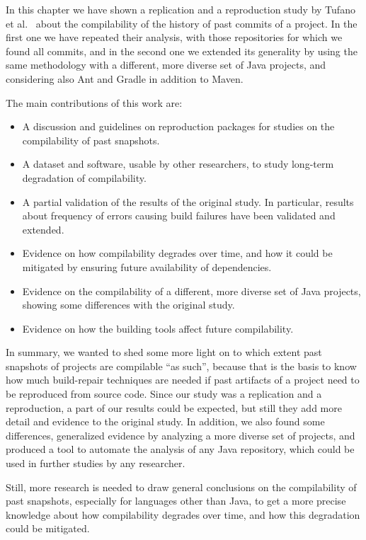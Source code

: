 In this chapter we have shown a replication and a reproduction study by Tufano et al.~\cite{tufano2017there} about the compilability of the history of past commits of a project. In the first one we have repeated their analysis, with those repositories for which we found all commits, and in the second one we extended its generality by using the same methodology with a different, more diverse set of Java projects, and considering also Ant and Gradle in addition to Maven.

The main contributions of this work are:

\begin{itemize}
\item A discussion and guidelines on reproduction packages for studies on the compilability of past snapshots. 
\item A dataset and software, usable by other researchers, to study long-term degradation of compilability.
\item A partial validation of the results of the original study. In particular, results about frequency of errors causing build failures have been validated and extended.
\item Evidence on how compilability degrades over time, and how it could be mitigated by ensuring future availability of dependencies.
\item Evidence on the compilability of a different, more diverse set of Java projects, showing some differences with the original study.
\item Evidence on how the building tools affect future compilability.
\end{itemize}

In summary, we wanted to shed some more light on to which extent past snapshots of projects are compilable ``as such'', because that is the basis to know how much build-repair techniques are needed if past artifacts of a project need to be reproduced from source code.
Since our study was a replication and a reproduction, a part of our results could be expected, but still they add more detail and evidence to the original study. In addition, we also found some differences, generalized evidence by analyzing a more diverse set of projects, and produced a tool to automate the analysis of any Java repository, which could be used in further studies by any researcher.

Still, more research is needed to draw general conclusions on the compilability of past snapshots, especially for languages other than Java, to get a more precise knowledge about how compilability degrades over time, and how this degradation could be mitigated.

